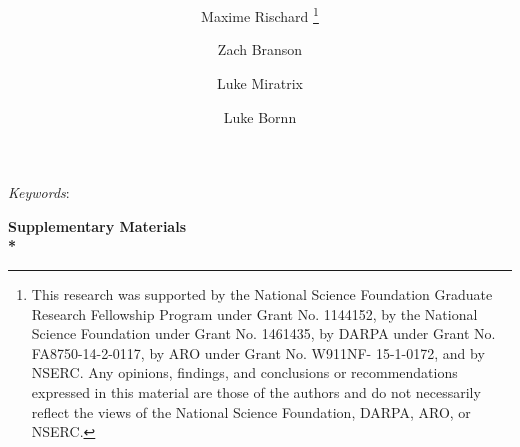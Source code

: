 \documentclass[12pt]{article}
\begin{document}
\singlespacing


\title{
    \georddtitle
}
\author[a]{Maxime Rischard
	\thanks{
		This research was supported by the National Science Foundation Graduate Research Fellowship Program under Grant No. 1144152, by the National Science Foundation under Grant No. 1461435, by DARPA under Grant No. FA8750-14-2-0117, by ARO under Grant No. W911NF- 15-1-0172, and by NSERC. Any opinions, findings, and conclusions or recommendations expressed in this material are those of the authors and do not necessarily reflect the views of the National Science Foundation, DARPA, ARO, or NSERC.
	}
}
\author[a]{Zach Branson}
\author[b]{Luke Miratrix}
\author[c]{Luke Bornn}
\maketitle

\begin{abstract}
    
\end{abstract}

\noindent%
{\it Keywords}: \georddkeywords
\vfill
\newpage



\pagebreak
\begin{center}
	\bf 
	\LARGE
	Supplementary Materials
	\\*
	\large
	\georddtitle
\end{center}
\setcounter{equation}{0}
\setcounter{figure}{0}
\setcounter{table}{0}
\setcounter{section}{0}
\newcommand{\sprefix}{S-}
\renewcommand{\theequation}{\sprefix\arabic{equation}}
\renewcommand{\thesection}{\sprefix\arabic{section}}
\renewcommand{\thefigure}{\sprefix\arabic{figure}}
\renewcommand{\thetable}{\sprefix\arabic{table}}


\end{document}
